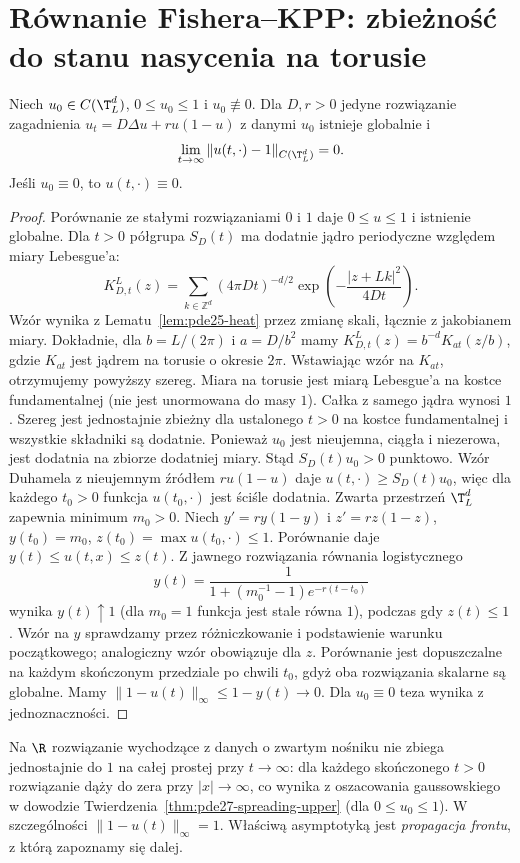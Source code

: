 \section{Równanie Fishera--KPP: zbieżność do stanu nasycenia na torusie}
\begin{twierdzenie}\label{thm:pde27-kpp-torus}
Niech $u_0\in C(\T_L^d)$, $0\le u_0\le1$ i
$u_0\not\equiv0$. Dla $D,r>0$ jedyne rozwiązanie
zagadnienia
$u_t=D\Delta u+ru(1-u)$ z danymi $u_0$
istnieje globalnie i
\[
 \lim_{t\to\infty}\|u(t,\cdot)-1\|_{C(\T_L^d)}=0.
\]
Jeśli $u_0\equiv0$, to $u(t,\cdot)\equiv0$.
\end{twierdzenie}
\begin{proof}
Porównanie ze stałymi rozwiązaniami $0$ i $1$
daje $0\le u\le1$ i istnienie globalne.
Dla $t>0$ półgrupa $S_D(t)$ ma dodatnie jądro
periodyczne względem miary Lebesgue'a:
\[
 K_{D,t}^L(z)=\sum_{k\in\mathbb Z^d}
 (4\pi Dt)^{-d/2}\exp\left(-\frac{|z+Lk|^2}{4Dt}\right).
\]
Wzór wynika z Lematu~\ref{lem:pde25-heat}
przez zmianę skali, łącznie z jakobianem miary.
Dokładnie, dla $b=L/(2\pi)$ i $a=D/b^2$ mamy
$K_{D,t}^L(z)=b^{-d}K_{at}(z/b)$, gdzie $K_{at}$
jest jądrem na torusie o okresie $2\pi$.
Wstawiając wzór na $K_{at}$, otrzymujemy powyższy
szereg. Miara na torusie jest miarą Lebesgue'a
na kostce fundamentalnej (nie jest unormowana
do masy $1$). Całka z samego jądra wynosi $1$.
Szereg jest jednostajnie zbieżny dla ustalonego $t>0$
na kostce fundamentalnej i wszystkie składniki są
dodatnie. Ponieważ $u_0$ jest nieujemna, ciągła
i niezerowa, jest dodatnia na zbiorze dodatniej miary.
Stąd $S_D(t)u_0>0$ punktowo.
Wzór Duhamela z nieujemnym źródłem $ru(1-u)$ daje
$u(t,\cdot)\ge S_D(t)u_0$, więc dla każdego $t_0>0$
funkcja $u(t_0,\cdot)$ jest ściśle dodatnia. Zwarta przestrzeń
$\T_L^d$ zapewnia minimum $m_0>0$.
Niech $y'=ry(1-y)$ i $z'=rz(1-z)$,
$y(t_0)=m_0$, $z(t_0)=\max u(t_0,\cdot)\le1$.
Porównanie daje $y(t)\le u(t,x)\le z(t)$.
Z jawnego rozwiązania równania logistycznego
\[
 y(t)=\frac{1}{1+(m_0^{-1}-1)e^{-r(t-t_0)}}
\]
wynika $y(t)\uparrow1$ (dla $m_0=1$ funkcja
jest stale równa $1$), podczas gdy $z(t)\le1$.
Wzór na $y$ sprawdzamy przez różniczkowanie
i podstawienie warunku początkowego; analogiczny
wzór obowiązuje dla $z$. Porównanie jest dopuszczalne
na każdym skończonym przedziale po chwili $t_0$,
gdyż oba rozwiązania skalarne są globalne.
Mamy $\|1-u(t)\|_\infty\le1-y(t)\to0$.
Dla $u_0\equiv0$ teza wynika z jednoznaczności.
\end{proof}

\begin{uwaga}
Na $\R$ rozwiązanie wychodzące z danych o zwartym nośniku
nie zbiega jednostajnie do $1$ na całej prostej
przy $t\to\infty$: dla każdego skończonego $t>0$
rozwiązanie dąży do zera przy $|x|\to\infty$, co
wynika z oszacowania gaussowskiego w dowodzie
Twierdzenia~\ref{thm:pde27-spreading-upper}
(dla $0\le u_0\le1$). W szczególności
$\|1-u(t)\|_\infty=1$. Właściwą asymptotyką jest
\emph{propagacja frontu}, z którą zapoznamy się dalej.
\end{uwaga}


